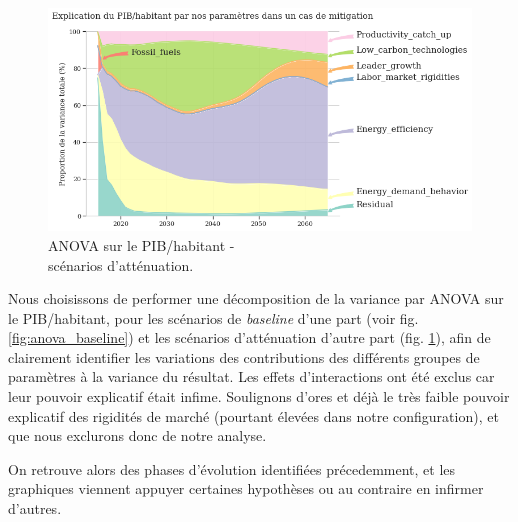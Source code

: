 \documentclass[a4,11pt]{aleph-notas}
\begin{document}
\begin{figure}[H]
        \centering
        \includegraphics[width=\textwidth]{images_IMACLIM/anova_mitigation.png}
        \caption{ANOVA sur le PIB/habitant - \\
        scénarios d'atténuation.}
        \label{fig:anova_mitigation}
\end{figure}

Nous choisissons de performer une décomposition de la variance par ANOVA sur le PIB/habitant, pour les scénarios de \textit{baseline} d'une part (voir fig. \ref{fig:anova_baseline}) et les scénarios d'atténuation d'autre part (fig. \ref{fig:anova_mitigation}), afin de clairement identifier les variations des contributions des différents groupes de paramètres à la variance du résultat. Les effets d'interactions ont été exclus car leur pouvoir explicatif était infime. Soulignons d'ores et déjà le très faible pouvoir explicatif des rigidités de marché (pourtant élevées dans notre configuration), et que nous exclurons donc de notre analyse.

On retrouve alors des phases d'évolution identifiées précedemment, et les graphiques viennent appuyer certaines hypothèses ou au contraire en infirmer d'autres. 
\end{document}

